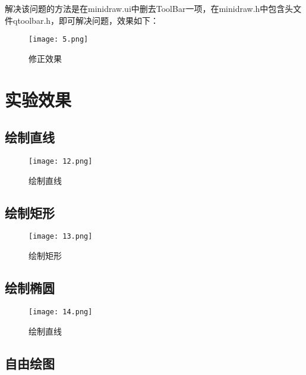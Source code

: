 \documentclass[14pt]{scrartcl} %
\begin{document}
解决该问题的方法是在minidraw.ui中删去ToolBar一项，在minidraw.h中包含头文件qtoolbar.h，即可解决问题，效果如下：

\begin{figure}[h] %
	\centering
	\texttt{[image: 5.png]} %
	\caption{修正效果}
\end{figure}

\pagebreak


\section{实验效果}

\subsection{绘制直线}

\begin{figure}[h] %
	\centering
	\texttt{[image: 12.png]} %
	\caption{绘制直线}
\end{figure}

\subsection{绘制矩形}

\begin{figure}[h] %
	\centering
	\texttt{[image: 13.png]} %
	\caption{绘制矩形}
\end{figure}


\pagebreak
\subsection{绘制椭圆}

\begin{figure}[h] %
	\centering
	\texttt{[image: 14.png]} %
	\caption{绘制直线}
\end{figure}

\subsection{自由绘图}
\end{document}
